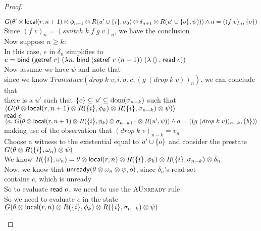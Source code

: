 \begin{proof}
\begin{tabbedproof}
\ooo $G(\theta' \otimes \mathsf{local}({r}, {n+1}) \otimes \phi_{n+1} \otimes R(u' \cup \{{i}\}, \sigma_0) \otimes \delta_{n+1} \otimes R(u' \cup \{{o}\}, \psi))) \land a = ((f\;v)_n, \{{o}\})$\\
\ooo Since $(f\;v)_n = (\mathit{switch}\;k\;f\;g\;v)_n$, we have the conclusion \\
\oo Now suppose $n \geq k$: \\
\ooo In this case, $e$ in $\delta_n$ simplifies to \\
\oooo $e = \mathsf{bind}\; (\mathsf{getref}\; r)\; (\lambda n.\;\mathsf{bind}\; (\mathsf{setref}\; r\;(n+1))\; (\lambda \left<\right>.\;\mathsf{read}\; c))$ \\
\ooo Now assume we have $\psi$ and note that  \\
\oooo since we know $\mathit{Transduce}(\mathit{drop}\;k\;v, i, \sigma, c, (g\;(\mathit{drop}\;k\;v))_n)$, we can conclude that \\
\oooo there is a $u'$ such that $\{{c}\} \subseteq u' \subseteq \mbox{dom}({\sigma_{n-k}})$ such that \\
\oooo $\left<G(\theta \otimes \mathsf{local}({r}, {n+1}) \otimes R(\{{i}\}, \phi_k) \otimes R(\{{i}\}, \sigma_{n-k}) \otimes \psi)\right>$ \\
\oooo $\mathsf{read}\; c$\\
\oooo $\left<a.\;G(\theta \otimes \mathsf{local}({r}, {n+1}) \otimes R(\{{i}\}, \phi_k) \otimes \sigma_{n-k+1} \otimes R(u', \psi))
      \land a = ((g\;(\mathit{drop}\;k\;v))_{n-k}, \{{b}\})\right>$ \\
\ooo making use of the observation that $(\mathit{drop}\;k\;v)_{n-k} = v_n$ \\
\ooo Choose a witness to the existential equal to $u' \cup \{{o}\}$ and consider the prestate \\
\ooo $G(\theta \otimes R(\{{i}\}, \omega_n) \otimes \psi)$ \\
\ooo We know $R(\{{i}\}, \omega_n) = \theta \otimes \mathsf{local}({r}, {n}) \otimes R(\{{i}\}, \phi_k) \otimes R(\{{i}\}, \sigma_{n-k}) \otimes \delta_n$ \\
\ooo Now, we know that $\mathsf{unready}({\theta \otimes \omega_n \otimes \psi}, {o})$, since $\delta_n$'s read set \\
\ooo contains $c$, which is unready \\
\ooo So to evaluate $\mathsf{read}\; o$, we need to use the \textsc{AUnready} rule \\
\ooo So we need to evaluate $e$ in the state \\
\ooo $G(\theta \otimes \mathsf{local}({r}, {n}) \otimes R(\{{i}\}, \phi_k) \otimes R(\{{i}\}, \sigma_{n-k}) \otimes \psi)$ \\

\end{tabbedproof}
\end{proof}
